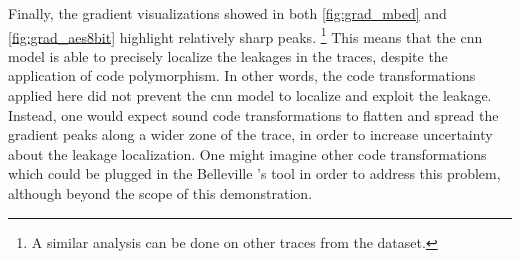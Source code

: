 Finally, the gradient visualizations showed in both \autoref{fig:grad_mbed} and \autoref{fig:grad_aes8bit} highlight relatively sharp peaks.%
\footnote{A similar analysis can be done on other traces from the dataset.}
This means that the \gls{cnn} model is able to precisely localize the leakages in the traces, despite the application of code polymorphism.
In other words, the code transformations applied here did not prevent the \gls{cnn} model to localize and exploit the leakage.
Instead, one would expect sound code transformations to flatten and spread the gradient peaks along a wider zone of the trace, in order to increase uncertainty about the leakage localization.
One might imagine other code transformations which could be plugged in the Belleville \etal{}'s tool in order to address this problem, although beyond the scope of this demonstration.